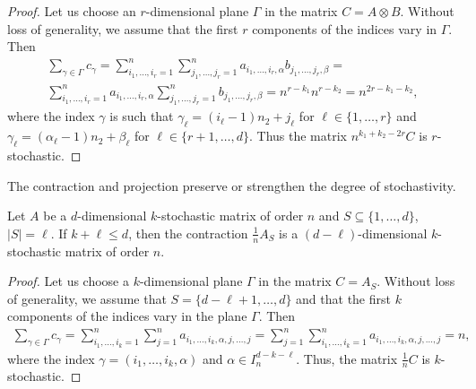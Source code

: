 \documentclass[a4paper]{article}
\begin{document}
\begin{proof}
Let us choose an $r$-dimensional plane $\Gamma$ in the matrix $C = A \otimes B$. Without loss of generality, we assume that the first $r$ components of the indices vary  in $\Gamma$. Then 
\begin{gather*}
\sum \limits_{\gamma \in \Gamma} c_\gamma = \sum\limits_{i_1, \ldots ,i_{r} = 1}^n  \sum\limits_{j_1, \ldots ,j_{r} = 1}^n  a_{i_1, \ldots ,i_{r}, \alpha} b_{j_1, \ldots , j_{r}, \beta}  = \\
 \sum\limits_{i_1, \ldots ,i_{r} = 1}^n   a_{i_1, \ldots ,i_{r}, \alpha}   \sum\limits_{j_1, \ldots ,j_{r} = 1}^n b_{j_1, \ldots , j_{r}, \beta}  = n^{r - k_1} n^{r - k_2} = n^{2r - k_1 -k_2},
 \end{gather*}
 where the index $\gamma$ is such that  $\gamma_{\ell} = (i_\ell - 1) n_2 + j_{\ell}$ for $\ell \in \{ 1, \ldots, r\}$ and $\gamma_\ell = (\alpha_\ell -1)n_2 +\beta_\ell $ for $\ell \in \{r+1, \ldots, d \}$.
Thus the matrix $n^{k_1 + k_2 - 2r} C$ is  $r$-stochastic.
\end{proof}



The contraction and projection  preserve or strengthen the degree of stochastivity.

\begin{teorema} \label{contractstoch}
Let $A$ be a $d$-dimensional $k$-stochastic matrix of order $n$ and $S \subseteq \{ 1, \ldots, d\}$, $|S| = \ell$. If $k + \ell \leq d$, then the contraction $\frac{1}{n}A_S$ is a $(d - \ell)$-dimensional $k$-stochastic matrix of order $n$.
\end{teorema}

\begin{proof}
Let us choose a $k$-dimensional plane $\Gamma$ in the matrix $C = A_S$. Without loss of generality, we assume that $S = \{d - \ell +1, \ldots, d \}$ and that  the first $k$ components of the indices vary  in  the plane $\Gamma$. Then 
\begin{gather*}
\sum \limits_{\gamma \in \Gamma} c_\gamma = \sum\limits_{i_1, \ldots ,i_{k} = 1}^n  \sum\limits_{j =1}^n  a_{i_1, \ldots ,i_{k}, \alpha, j, \ldots, j}  = 
\sum\limits_{j =1}^n \sum\limits_{i_1, \ldots ,i_{k} = 1}^n  a_{i_1, \ldots ,i_{k}, \alpha, j, \ldots, j}   = n,
 \end{gather*}
 where the index $\gamma = (i_1, \ldots, i_k, \alpha)$ and $\alpha \in I_{n}^{d - k - \ell}$.
Thus, the matrix $\frac{1}{n} C$ is  $k$-stochastic.
\end{proof}
\end{document}

